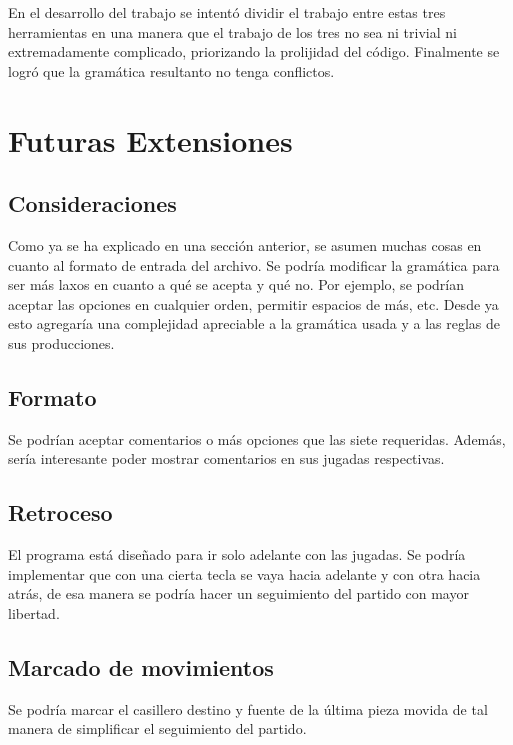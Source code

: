\documentclass[a4paper,10pt]{article}
\begin{document}
En el desarrollo del trabajo se intentó dividir el trabajo entre estas tres herramientas en una manera que el trabajo de los tres no sea ni trivial ni 
extremadamente complicado, priorizando la prolijidad del código. Finalmente se logró que la gramática resultanto no tenga conflictos.


\newpage

\section{Futuras Extensiones}

\subsection{ Consideraciones }

Como ya se ha explicado en una sección anterior, se asumen muchas cosas en cuanto al formato de entrada del archivo. Se podría modificar la gramática para 
ser más laxos en cuanto a qué se acepta y qué no. Por ejemplo, se podrían aceptar las opciones en cualquier orden, permitir espacios de más, etc. Desde ya 
esto agregaría una complejidad apreciable a la gramática usada y a las reglas de sus producciones.

\subsection{ Formato }

Se podrían aceptar comentarios o más opciones que las siete requeridas. Además, sería interesante poder mostrar comentarios en sus jugadas respectivas. 

\subsection{ Retroceso }

El programa está diseñado para ir solo adelante con las jugadas. Se podría implementar que con una cierta tecla se vaya hacia adelante y con otra hacia atrás, 
de esa manera se podría hacer un seguimiento del partido con mayor libertad.

\subsection{ Marcado de movimientos }

Se podría marcar el casillero destino y fuente de la última pieza  movida de tal manera de simplificar el seguimiento del partido.
   
\end{document}
